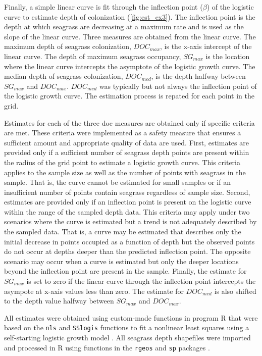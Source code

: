 \documentclass[letterpaper,12pt,oneside]{article}\usepackage[]{graphicx}\usepackage[]{color}
\begin{document}
Finally, a simple linear curve is fit through the inflection point ($\beta$) of the logistic curve to estimate depth of colonization (\cref{fig:est_ex3}).  The inflection point is the depth at which seagrass are decreasing at a maximum rate and is used as the slope of the linear curve.  Three measures are obtained from the linear curve. The maximum depth of seagrass colonization, $DOC_{max}$, is the x-axis intercept of the linear curve.  The depth of maximum seagrass occupancy, $SG_{max}$ is the location where the linear curve intercepts the asymptote of the logistic growth curve.  The median depth of seagrass colonization, $DOC_{med}$, is the depth halfway between $SG_{max}$ and $DOC_{max}$.  $DOC_{med}$ was typically but not always the inflection point of the logistic growth curve.  The estimation process is repated for each point in the grid.   

Estimates for each of the three \ac{doc} measures are obtained only if specific criteria are met.  These criteria were implemented as a safety measure that ensures a sufficient amount and appropriate quality of data are used.  First, estimates are provided only if a sufficient number of seagrass depth points are present within the radius of the grid point to estimate a logistic growth curve.  This criteria applies to the sample size as well as the number of points with seagrass in the sample.  That is, the curve cannot be estimated for small samples or if an insufficient number of points contain seagrass regardless of sample size.  Second, estimates are provided only if an inflection point is present on the logistic curve within the range of the sampled depth data.  This criteria may apply under two scenarios where the curve is estimated but a trend is not adequately described by the sampled data.  That is, a curve may be estimated that describes only the initial decrease in points occupied as a function of depth but the observed points do not occur at depths deeper than the predicted inflection point.  The opposite scenario may occur when a curve is estimated but only the deeper locations beyond the inflection point are present in the sample.  Finally, the estimate for $SG_{max}$ is set to zero if the linear curve through the inflection point intercepts the asympote at x-axis values less than zero.  The estimate for $DOC_{med}$ is also shifted to the depth value halfway between $SG_{max}$ and $DOC_{max}$.  

All estimates were obtained using custom-made functions in program R that were based on the \texttt{nls} and \texttt{SSlogis} functions to fit a nonlinear least squares using a self-starting logistic growth model \citep{Bates92,RDCT14}.  All seagrass depth shapefiles were imported and processed in R using functions in the \texttt{rgeos} and \texttt{sp} packages \citep{Bivand08,Bivand14}.  
\end{document}
